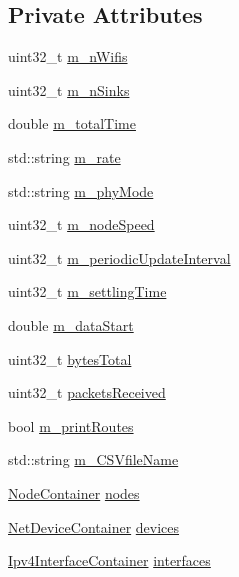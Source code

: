 \subsection*{Private Attributes}
\begin{DoxyCompactItemize}
\item 
uint32\+\_\+t \hyperlink{classDsdvManetExample_af93dd61354333a98a99cbd6aa697e8f2}{m\+\_\+n\+Wifis}
\item 
uint32\+\_\+t \hyperlink{classDsdvManetExample_a090d01720df5ef23d7fa89a0dccf721d}{m\+\_\+n\+Sinks}
\item 
double \hyperlink{classDsdvManetExample_ae60447d408304e33046dc852cf7ff083}{m\+\_\+total\+Time}
\item 
std\+::string \hyperlink{classDsdvManetExample_a4a42ae0b86272e28591c7546d8235aac}{m\+\_\+rate}
\item 
std\+::string \hyperlink{classDsdvManetExample_af6bfad66bcb58bc8b1ffa4db12ad58dd}{m\+\_\+phy\+Mode}
\item 
uint32\+\_\+t \hyperlink{classDsdvManetExample_a8f977ed90cf0bbef3b4d95cfe08a6056}{m\+\_\+node\+Speed}
\item 
uint32\+\_\+t \hyperlink{classDsdvManetExample_af850aea141a571eb01896a3b7f36d7d2}{m\+\_\+periodic\+Update\+Interval}
\item 
uint32\+\_\+t \hyperlink{classDsdvManetExample_aaa43812d7f08d1d314ca3efdcc3d24e2}{m\+\_\+settling\+Time}
\item 
double \hyperlink{classDsdvManetExample_a15d0dc8ff0e1250a9dea2a3feda92802}{m\+\_\+data\+Start}
\item 
uint32\+\_\+t \hyperlink{classDsdvManetExample_a5eb98ea1fed409381136dd60bca0da26}{bytes\+Total}
\item 
uint32\+\_\+t \hyperlink{classDsdvManetExample_a2b03f3d87eac2f09e1384bbb828e4408}{packets\+Received}
\item 
bool \hyperlink{classDsdvManetExample_a766aeb108aa6ff45ea6729fe875e89b3}{m\+\_\+print\+Routes}
\item 
std\+::string \hyperlink{classDsdvManetExample_a1c3a27e5db9010d35d93d24f07b69d18}{m\+\_\+\+C\+S\+Vfile\+Name}
\item 
\hyperlink{classns3_1_1NodeContainer}{Node\+Container} \hyperlink{classDsdvManetExample_a0d8c36ee21821999cc05443bb7efbb8f}{nodes}
\item 
\hyperlink{classns3_1_1NetDeviceContainer}{Net\+Device\+Container} \hyperlink{classDsdvManetExample_ad8353ca6796e0e793ee95bdedcc35193}{devices}
\item 
\hyperlink{classns3_1_1Ipv4InterfaceContainer}{Ipv4\+Interface\+Container} \hyperlink{classDsdvManetExample_aaae8652c3aa04761bb64671bcb493205}{interfaces}
\end{DoxyCompactItemize}


